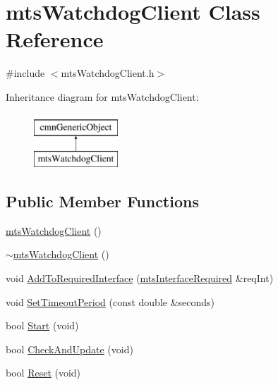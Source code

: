\hypertarget{classmts_watchdog_client}{\section{mts\-Watchdog\-Client Class Reference}
\label{classmts_watchdog_client}
}


{\ttfamily \#include $<$mts\-Watchdog\-Client.\-h$>$}

Inheritance diagram for mts\-Watchdog\-Client\-:\begin{figure}[H]
\begin{center}
\leavevmode
\includegraphics[height=2.000000cm]{dc/d03/classmts_watchdog_client}
\end{center}
\end{figure}
\subsection*{Public Member Functions}
\begin{DoxyCompactItemize}
\item 
\hyperlink{classmts_watchdog_client_a89ea1e18dd8148b42355cf863ce10c45}{mts\-Watchdog\-Client} ()
\item 
\hyperlink{classmts_watchdog_client_accbf3feab5979c90424cdd5e1bf5fbcb}{$\sim$mts\-Watchdog\-Client} ()
\item 
void \hyperlink{classmts_watchdog_client_a3f3698d2ed1d0e4de2436acd3baff029}{Add\-To\-Required\-Interface} (\hyperlink{classmts_interface_required}{mts\-Interface\-Required} \&req\-Int)
\item 
void \hyperlink{classmts_watchdog_client_a4f95073afcc8c345aa04cf80d29d4b9c}{Set\-Timeout\-Period} (const double \&seconds)
\item 
bool \hyperlink{classmts_watchdog_client_a8b6b2b18d602ca0bd8ddde6364ea5932}{Start} (void)
\item 
bool \hyperlink{classmts_watchdog_client_af7599c2def040faf6ed0b931effe573d}{Check\-And\-Update} (void)
\item 
bool \hyperlink{classmts_watchdog_client_aa8be0e6aef6566d29a69bcd7a74d22bc}{Reset} (void)
\end{DoxyCompactItemize}
